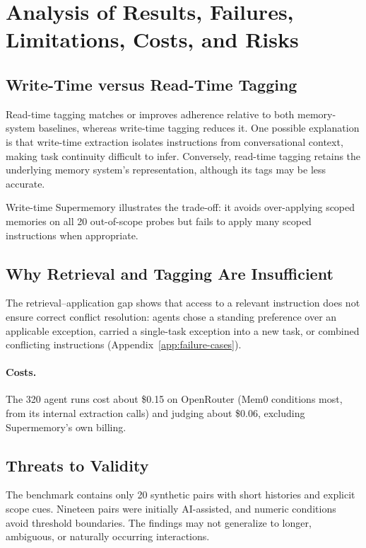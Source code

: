 \section{Analysis of Results, Failures, Limitations, Costs, and Risks}
\label{sec:discussion}

\subsection{Write-Time versus Read-Time Tagging}

Read-time tagging matches or improves adherence
relative to both memory-system baselines, whereas
write-time tagging reduces it. One possible
explanation is that write-time extraction isolates
instructions from conversational context, making
task continuity difficult to infer. Conversely,
read-time tagging retains the underlying memory
system's representation, although its tags may
be less accurate.

Write-time Supermemory illustrates the trade-off:
it avoids over-applying scoped memories on all
20 out-of-scope probes but fails to apply many
scoped instructions when appropriate.

\subsection{Why Retrieval and Tagging Are Insufficient}

The retrieval--application gap shows that access
to a relevant instruction does not ensure correct
conflict resolution: agents chose a standing
preference over an applicable exception, carried a
single-task exception into a new task, or combined
conflicting instructions (Appendix~\ref{app:failure-cases}).

\paragraph{Costs.}
The 320 agent runs cost about \$0.15 on OpenRouter
(Mem0 conditions most, from its internal extraction calls)
and judging about \$0.06, excluding Supermemory's own billing.

\subsection{Threats to Validity}

The benchmark contains only 20 synthetic pairs
with short histories and explicit scope cues.
Nineteen pairs were initially AI-assisted, and
numeric conditions avoid threshold boundaries.
The findings may not generalize to longer,
ambiguous, or naturally occurring interactions.

